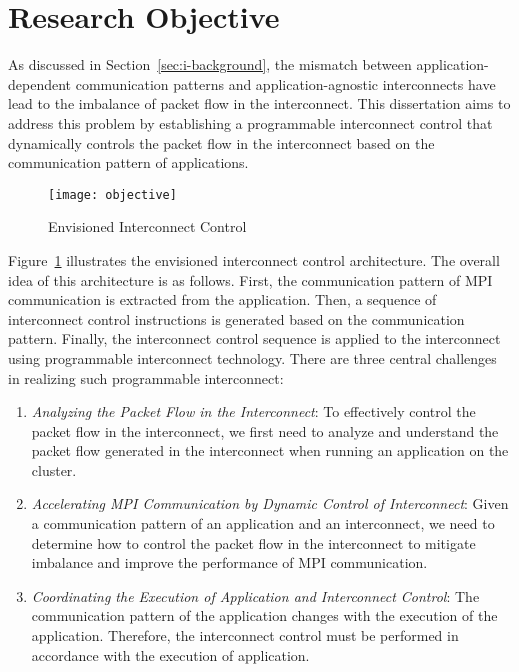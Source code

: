 
\section{Research Objective}

As discussed in Section~\ref{sec:i-background}, the mismatch between
application-dependent communication patterns and application-agnostic
interconnects have lead to the imbalance of packet flow in the interconnect.
This dissertation aims to address this problem by establishing a programmable
interconnect control that dynamically controls the packet flow in the
interconnect based on the communication pattern of applications.

\begin{figure}
    \centering
    \texttt{[image: objective]}
    \caption{Envisioned Interconnect Control}%
    \label{fig:objective}
\end{figure}

Figure~\ref{fig:objective} illustrates the envisioned interconnect control
architecture. The overall idea of this architecture is as follows. First, the
communication pattern of MPI communication is extracted from the application.
Then, a sequence of interconnect control instructions is generated based on
the communication pattern. Finally, the interconnect control sequence is
applied to the interconnect using programmable interconnect technology.
There are three central challenges in realizing such programmable interconnect:

\begin{enumerate}
\item \emph{Analyzing the Packet Flow in the Interconnect}:
    To effectively control the packet flow in the interconnect, we first need
    to analyze and understand the packet flow generated in the interconnect
    when running an application on the cluster.
\item \emph{Accelerating MPI Communication by Dynamic Control of Interconnect}:
    Given a communication pattern of an application and an interconnect,
    we need to determine how to control the packet flow in the interconnect to
    mitigate imbalance and improve the performance of MPI communication.
\item \emph{Coordinating the Execution of Application and Interconnect Control}:
    The communication pattern of the application changes with the execution of
    the application. Therefore, the interconnect control must be performed in
    accordance with the execution of application.
\end{enumerate}

